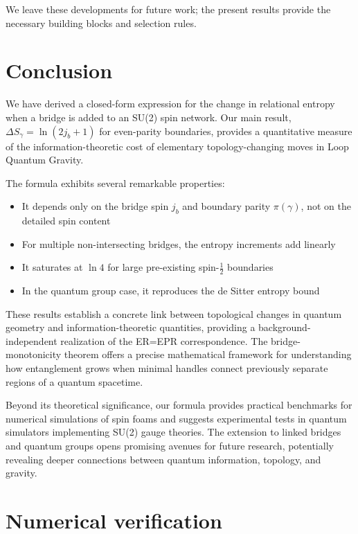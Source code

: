 \documentclass[11pt, a4paper]{article}
\theoremstyle{plain}
\theoremstyle{definition}
\theoremstyle{remark}
\begin{document}
We leave these developments for future work; the present results provide the necessary building blocks and selection rules.

\section{Conclusion}

We have derived a closed-form expression for the change in relational entropy when a bridge is added to an SU(2) spin network. Our main result, $\Delta S_{\gamma} = \ln(2j_b+1)$ for even-parity boundaries, provides a quantitative measure of the information-theoretic cost of elementary topology-changing moves in Loop Quantum Gravity.

The formula exhibits several remarkable properties:
\begin{itemize}
\item It depends only on the bridge spin $j_b$ and boundary parity $\pi(\gamma)$, not on the detailed spin content
\item For multiple non-intersecting bridges, the entropy increments add linearly
\item It saturates at $\ln 4$ for large pre-existing spin-$\frac{1}{2}$ boundaries
\item In the quantum group case, it reproduces the de Sitter entropy bound
\end{itemize}

These results establish a concrete link between topological changes in quantum geometry and information-theoretic quantities, providing a background-independent realization of the ER=EPR correspondence. The bridge-monotonicity theorem offers a precise mathematical framework for understanding how entanglement grows when minimal handles connect previously separate regions of a quantum spacetime.

Beyond its theoretical significance, our formula provides practical benchmarks for numerical simulations of spin foams and suggests experimental tests in quantum simulators implementing SU(2) gauge theories. The extension to linked bridges and quantum groups opens promising avenues for future research, potentially revealing deeper connections between quantum information, topology, and gravity.

\appendix
\section{Numerical verification}
\label{app:numerical}
\end{document}

